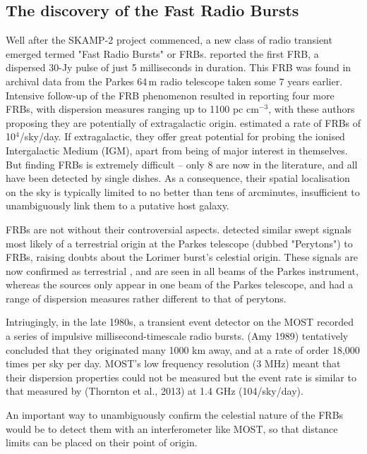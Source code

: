 \subsection{The discovery of the Fast Radio Bursts}

Well after the SKAMP-2 project commenced, a new class of radio transient emerged termed "Fast Radio Bursts" or FRBs. \cite{Lorimer_2007} reported the first FRB, a dispersed 30-Jy pulse of just 5 milliseconds in duration. This FRB was found in archival data from the Parkes 64\,m radio telescope taken some 7 years earlier. Intensive follow-up of the FRB phenomenon resulted in \citep{Thornton_2013} reporting four more FRBs, with dispersion measures ranging up to 1100 pc cm$^{-3}$, with these authors proposing they are potentially of extragalactic origin. \citep{Thornton_2013} estimated a rate of FRBs of 10$^4$/sky/day. If extragalactic, they offer great potential for probing the ionised Intergalactic Medium (IGM), apart from being of major interest in themselves. But finding FRBs is extremely difficult \cite{Keane_2012} -- only 8 are now in the literature, and all have been detected by single dishes. As a consequence, their spatial localisation on the sky is typically limited to no better than tens of arcminutes, insufficient to unambiguously link them to a putative host galaxy. 

FRBs are not without their controversial aspects. \cite{Burke_Spolaor_2011} detected similar swept signals most likely of a terrestrial origin at the Parkes telescope (dubbed "Perytons") to FRBs, raising doubts about the Lorimer burst's celestial origin. These signals are now confirmed as terrestrial \cite{2015arXiv150402165P}, and are seen in all beams of the Parkes instrument, whereas the \cite{Thornton_2013} sources only appear in one beam of the Parkes telescope, and had a range of dispersion measures rather different to that of perytons.

Intriugingly, in the late 1980s, a transient event detector on the MOST recorded a series of impulsive millisecond-timescale radio bursts. (Amy 1989) tentatively concluded that they originated many 1000 km away, and at a rate of order 18,000 times per sky per day. MOST’s low frequency resolution (3 MHz) meant that their dispersion properties could not be measured but the event rate is similar to that measured by (Thornton et al., 2013) at 1.4 GHz (104/sky/day).

An important way to unambiguously confirm the celestial nature of the FRBs would be to detect them with an interferometer like MOST, so that distance limits can be placed on their point of origin.
    